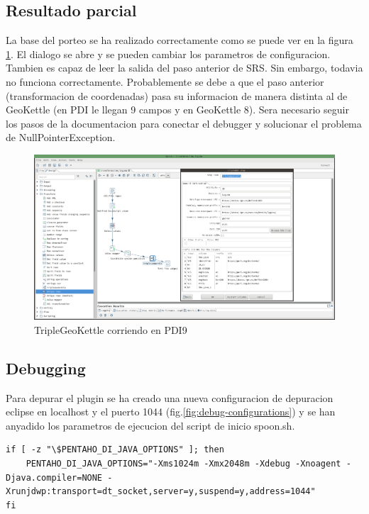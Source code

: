 \subsection{Resultado parcial}

La base del porteo se ha realizado correctamente como se puede ver en la figura \ref{fig:TGK-portado}. El dialogo
se abre y se pueden cambiar los parametros de configuracion. Tambien es capaz de leer la salida del paso anterior
de SRS. Sin embargo, todavia no funciona correctamente. Probablemente se debe a que el paso
anterior (transformacion de coordenadas) pasa su informacion de manera distinta al de GeoKettle (en PDI le llegan
9 campos y en GeoKettle 8). Sera necesario seguir los pasos de la documentacion para conectar el debugger y solucionar el
problema de NullPointerException.

\begin{figure}[H]
    \includegraphics[width=\textwidth]{images/TGK-portado.png}
    \centering
    \caption{TripleGeoKettle corriendo en PDI9}
    \label{fig:TGK-portado}
\end{figure}


\subsection{Debugging}

Para depurar el plugin se ha creado una nueva configuracion de depuracion eclipse en localhost y el puerto 1044
(fig.\ref{fig:debug-configurations}) y se han anyadido los parametros de ejecucion del script de inicio spoon.sh.

\begin{lstlisting}
if [ -z "\$PENTAHO_DI_JAVA_OPTIONS" ]; then
    PENTAHO_DI_JAVA_OPTIONS="-Xms1024m -Xmx2048m -Xdebug -Xnoagent -Djava.compiler=NONE -Xrunjdwp:transport=dt_socket,server=y,suspend=y,address=1044"
fi
\end{lstlisting}

